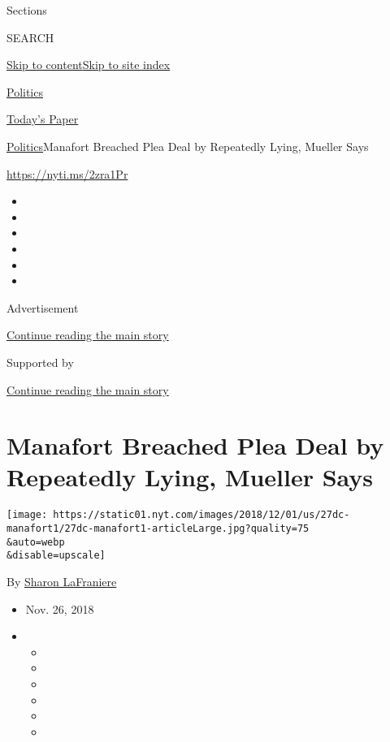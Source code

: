 Sections

SEARCH

\protect\hyperlink{site-content}{Skip to
content}\protect\hyperlink{site-index}{Skip to site index}

\href{https://www.nytimes.com/section/politics}{Politics}

\href{https://myaccount.nytimes.com/auth/login?response_type=cookie\&client_id=vi}{}

\href{https://www.nytimes.com/section/todayspaper}{Today's Paper}

\href{/section/politics}{Politics}\textbar{}Manafort Breached Plea Deal
by Repeatedly Lying, Mueller Says

\url{https://nyti.ms/2zra1Pr}

\begin{itemize}
\item
\item
\item
\item
\item
\item
\end{itemize}

Advertisement

\protect\hyperlink{after-top}{Continue reading the main story}

Supported by

\protect\hyperlink{after-sponsor}{Continue reading the main story}

\hypertarget{manafort-breached-plea-deal-by-repeatedly-lying-mueller-says}{%
\section{Manafort Breached Plea Deal by Repeatedly Lying, Mueller
Says}\label{manafort-breached-plea-deal-by-repeatedly-lying-mueller-says}}

\texttt{[image: https://static01.nyt.com/images/2018/12/01/us/27dc-manafort1/27dc-manafort1-articleLarge.jpg?quality=75\\\&auto=webp\\\&disable=upscale]}

By \href{https://www.nytimes.com/by/sharon-lafraniere}{Sharon
LaFraniere}

\begin{itemize}
\item
  Nov. 26, 2018
\item
  \begin{itemize}
  \item
  \item
  \item
  \item
  \item
  \item
  \end{itemize}
\end{itemize}

